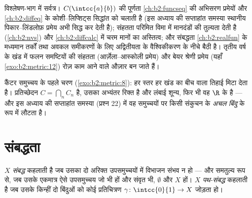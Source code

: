 \begin{remark}[यह अध्याय कहाँ काम आता है]
विश्लेषण-भाग में सर्वत्र। $C(\intcc{a}{b})$ की पूर्णता \cref{ch:b2:funcseq} की अभिसरण प्रमेयों और \cref{ch:b2:diffeq}
के कोशी--लिप्शिट्स सिद्धांत को चलाती है (इस अध्याय की सप्ताहांत समस्या
स्थानीय पिकार--लिंडलोफ़ प्रमेय अभी सिद्ध कर देती है); संहतता परिमित विमा
में मानदंडों की तुल्यता देती है (\cref{ch:b2:nvs}) और \cref{ch:b2:diffcalc} में चरम मानों का
अस्तित्व; और संबद्धता \cref{ch:b2:realfun} के मध्यमान तर्कों तथा अवकल समीकरणों के लिए
अद्वितीयता के वैश्विकीकरण के नीचे बैठी है। तृतीय वर्ष के खंड में फलन
समष्टियों की संहतता (आर्ज़ेला--आस्कोली प्रमेय) और बेयर श्रेणी प्रमेय
(यहाँ \cref{exo:b2:metric:12}) रोज़ काम आने वाले औज़ार बन जाते हैं।
\end{remark}

\begin{omfigure}

{\small कैंटर समुच्चय के पहले चरण (\cref{exo:b2:metric:8}): हर स्तर हर खंड का बीच वाला
 तिहाई मिटा देता है। प्रतिच्छेदन $C = \bigcap_n C_n$  है, उसका अभ्यंतर रिक्त
है और लंबाई शून्य, फिर भी वह $\R$ के  है --- और इस अध्याय की
सप्ताहांत समस्या (प्रश्न 22) में वह समुच्चयों पर किसी संकुचन के
\emph{अचल बिंदु} के रूप में लौटता है।}
\end{omfigure}

\section{संबद्धता}

\begin{definition}\label{def:b2:metric:connected}
$X$ \emph{संबद्ध} कहलाती है जब उसका दो अरिक्त
 उपसमुच्चयों में विभाजन संभव न हो --- और समतुल्य रूप से, जब उसके
एकमात्र ऐसे उपसमुच्चय जो  भी हों और संवृत भी, $\emptyset$ और $X$ हों। $X$
\emph{पथ-संबद्ध} कहलाती है जब उसके किन्हीं दो बिंदुओं को कोई 
प्रतिचित्रण $\gamma \colon \intcc{0}{1} \to X$ जोड़ता हो।
\end{definition}

